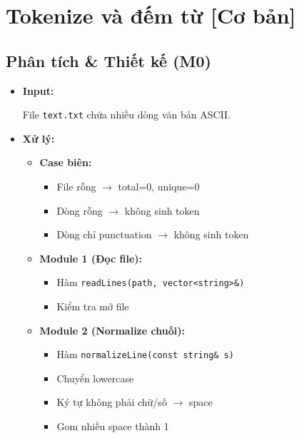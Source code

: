 \section{Tokenize và đếm từ [Cơ bản]}
\subsection{Phân tích \& Thiết kế (M0)}

\begin{itemize}

    \item \textbf{Input:}

    File \texttt{text.txt} chứa nhiều dòng văn bản ASCII.

    \item \textbf{Xử lý:}

    \begin{itemize}

        \item \textbf{Case biên:}

        \begin{itemize}
            \item File rỗng $\rightarrow$ total=0, unique=0
            \item Dòng rỗng $\rightarrow$ không sinh token
            \item Dòng chỉ punctuation $\rightarrow$ không sinh token
        \end{itemize}

        \item \textbf{Module 1 (Đọc file):}

        \begin{itemize}
            \item Hàm \texttt{readLines(path, vector<string>\&)}
            \item Kiểm tra mở file
        \end{itemize}

        \item \textbf{Module 2 (Normalize chuỗi):}

        \begin{itemize}
            \item Hàm \texttt{normalizeLine(const string\& s)}
            \item Chuyển lowercase
            \item Ký tự không phải chữ/số $\rightarrow$ space
            \item Gom nhiều space thành 1
        \end{itemize}


\end{itemize}
\end{itemize}
